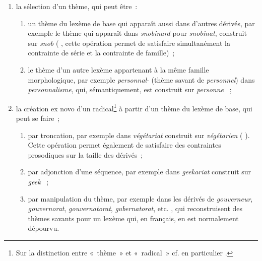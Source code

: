 \documentclass[output=paper]{langsci/langscibook}
\begin{document}
\begin{enumerate}[label=\roman*)]
\item  la sélection d'un thème, qui peut être~:


\begin{enumerate}[label=\alph*)]
\item un thème du lexème de base qui apparaît aussi dans d'autres dérivés, par
exemple le thème qui apparaît dans \emph{snobinard} pour
\emph{snobinat}, construit sur \emph{snob} %
(\citealt{Plenat-Roche2014}%
%
, cette
opération permet de satisfaire simultanément la contrainte de série et
la contrainte de famille)~;

\item le thème d'un autre lexème appartenant à la même famille
morphologique, par exemple \emph{personnal}- (thème savant de
\emph{personnel}) dans \emph{personnalisme}, qui, sémantiquement, est
construit sur \emph{personne} %
\citep[159]{Roche2009}%
%
~;

\end{enumerate}

\item  la création ex novo d'un radical\footnote{Sur la distinction entre
  «~thème~» et «~radical~» cf. en particulier %
\citet{Roche10}%
%
.} à partir d'un
thème du lexème de base, qui peut se faire~;

\begin{enumerate}[label=\alph*)]
\item par troncation, par exemple dans \emph{végétariat} construit sur
\emph{végétarien} %
(\citealt[67]{Plenat-Roche2014}%
%
). Cette opération permet
également de satisfaire des con\-traintes prosodiques sur la taille des
dérivés~;

\item par adjonction d'une séquence, par exemple dans \emph{geekariat}
construit sur \emph{geek} %
\citep[69]{Plenat-Roche2014}%
%
~;

\item par manipulation du thème, par exemple dans les dérivés de
\emph{gouverneur}, \emph{gouvernorat}, \emph{gouvernatorat},
\emph{gubernatorat}, etc. %
\citep[59]{Plenat-Roche2014}%
%
, qui
reconstruisent des thèmes savants pour un lexème qui, en français, en
est normalement dépourvu.
\end{enumerate}
\end{enumerate}
\end{document}
